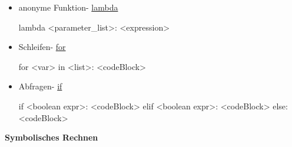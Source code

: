 \documentclass[a4paper,9pt,DIV15,twocolumn]{scrartcl}
\begin{document}
\begin{itemize}
 \item anonyme Funktion- \href{http://docs.python.org/howto/functional.html#small-functions-and-the-lambda-expression}{lambda}
\begin{sagein}
lambda <parameter_list>: <expression> 
\end{sagein}
 \item Schleifen- \href{http://docs.python.org/tutorial/controlflow.html#for-statements}{for}
\begin{sagein}
for <var> in <list>:
    <codeBlock>
\end{sagein}
 \item Abfragen- \href{http://docs.python.org/reference/compound_stmts.html#the-if-statement}{if}
\begin{sagein}
if <boolean expr>:
    <codeBlock>
elif <boolean expr>:
		<codeBlock>
else:
    <codeBlock>
\end{sagein}

\end{itemize}
\textbf{Symbolisches Rechnen}
\end{document}
